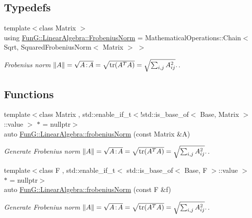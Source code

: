 \subsection*{Typedefs}
\begin{DoxyCompactItemize}
\item 
{\footnotesize template$<$class Matrix $>$ }\\using \hyperlink{group__LinearAlgebraGroup_gad209833e37a25e863fe72868d37795b8}{Fun\+G\+::\+Linear\+Algebra\+::\+Frobenius\+Norm} = Mathematical\+Operations\+::\+Chain$<$ Sqrt, Squared\+Frobenius\+Norm$<$ Matrix $>$ $>$
\begin{DoxyCompactList}\small\item\em Frobenius norm $ \|A\| = \sqrt{A\negthinspace : \negthinspace A }= \sqrt{\mathrm{tr}(A^TA)} = \sqrt{\sum_{i,j} A_{ij}^2}. $. \end{DoxyCompactList}\end{DoxyCompactItemize}
\subsection*{Functions}
\begin{DoxyCompactItemize}
\item 
{\footnotesize template$<$class Matrix , std\+::enable\+\_\+if\+\_\+t$<$!std\+::is\+\_\+base\+\_\+of$<$ Base, Matrix $>$\+::value $>$ $\ast$  = nullptr$>$ }\\auto \hyperlink{group__LinearAlgebraGroup_gaa893e7d667dde98d2b119ca004745186}{Fun\+G\+::\+Linear\+Algebra\+::frobenius\+Norm} (const Matrix \&A)
\begin{DoxyCompactList}\small\item\em Generate Frobenius norm $ \|A\| = \sqrt{A\negthinspace : \negthinspace A }= \sqrt{\mathrm{tr}(A^TA)} = \sqrt{\sum_{i,j} A_{ij}^2}. $. \end{DoxyCompactList}\item 
{\footnotesize template$<$class F , std\+::enable\+\_\+if\+\_\+t$<$ std\+::is\+\_\+base\+\_\+of$<$ Base, F $>$\+::value $>$ $\ast$  = nullptr$>$ }\\auto \hyperlink{group__LinearAlgebraGroup_gafa2f358f9310cecb787620ad8ec460a6}{Fun\+G\+::\+Linear\+Algebra\+::frobenius\+Norm} (const F \&f)
\begin{DoxyCompactList}\small\item\em Generate Frobenius norm $ \|A\| = \sqrt{A\negthinspace : \negthinspace A }= \sqrt{\mathrm{tr}(A^TA)} = \sqrt{\sum_{i,j} A_{ij}^2}. $. \end{DoxyCompactList}\end{DoxyCompactItemize}
